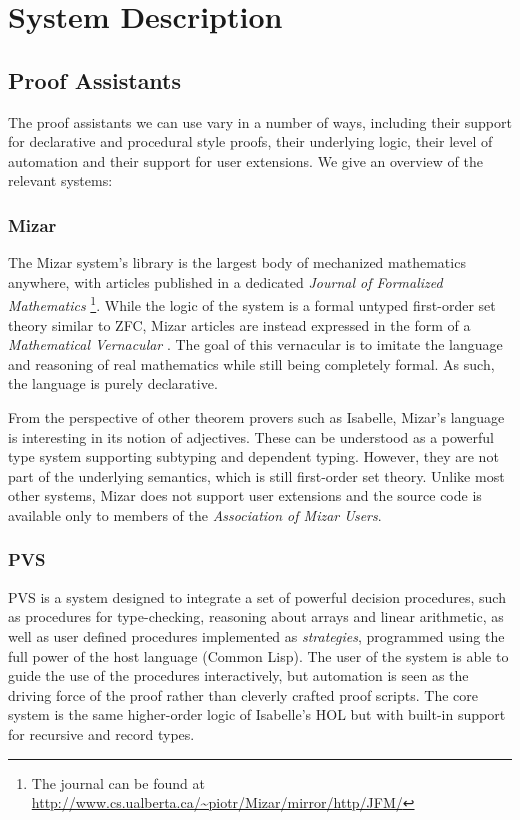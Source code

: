 \chapter{System Description}\label{chapter:System}
\section{Proof Assistants}\label{ProofAssistants}
The proof assistants we can use vary in a number of ways, including their support for declarative and procedural style proofs, their underlying logic, their level of automation and their support for user extensions. We give an overview of the relevant systems:

\subsection{Mizar}\label{Mizar}
The Mizar system's library is the largest body of mechanized mathematics anywhere, with articles published in a dedicated \emph{Journal of Formalized Mathematics} \cite{MizarSoftTypes}\footnote{The journal can be found at \url{http://www.cs.ualberta.ca/~piotr/Mizar/mirror/http/JFM/}}. While the logic of the system is a formal untyped first-order set theory similar to ZFC, Mizar articles are instead expressed in the form of a \emph{Mathematical Vernacular} \cite{MizarMathematicalVernacular}. The goal of this vernacular is to imitate the language and reasoning of real mathematics while still being completely formal. As such, the language is purely declarative. 

From the perspective of other theorem provers such as Isabelle, Mizar's language is interesting in its notion of adjectives. These can be understood as a powerful type system supporting subtyping and dependent typing. However, they are not part of the underlying semantics, which is still first-order set theory. Unlike most other systems, Mizar does not support user extensions and the source code is available only to members of the \emph{Association of Mizar Users}.

\subsection{PVS}
PVS is a system designed to integrate a set of powerful decision procedures, such as procedures for type-checking, reasoning about arrays and linear arithmetic, as well as user defined procedures implemented as \emph{strategies}, programmed using the full power of the host language (Common Lisp). The user of the system is able to guide the use of the procedures interactively, but automation is seen as the driving force of the proof rather than cleverly crafted proof scripts. The core system is the same higher-order logic of Isabelle's HOL but with built-in support for recursive and record types. 

